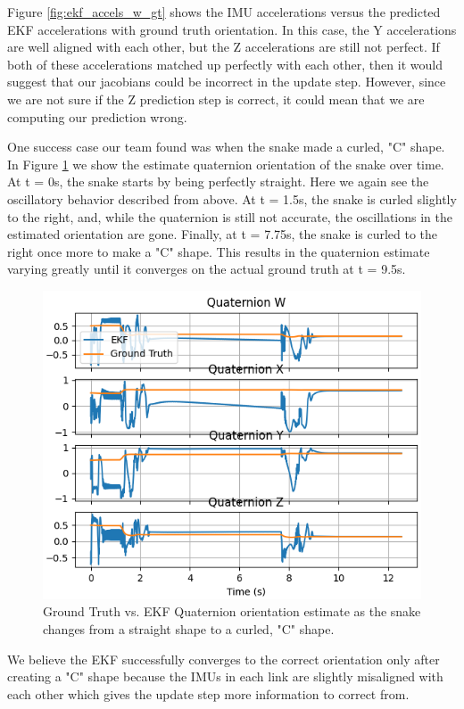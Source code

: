 \documentclass[letterpaper, 10 pt, conference]{ieeeconf}  %
\begin{document}
Figure \ref{fig:ekf_accels_w_gt} shows the IMU accelerations versus the predicted EKF accelerations with ground truth orientation. In this case, the Y accelerations are well aligned with each other, but the Z accelerations are still not perfect. If both of these accelerations matched up perfectly with each other, then it would suggest that our jacobians could be incorrect in the update step. However, since we are not sure if the Z prediction step is correct, it could mean that we are computing our prediction wrong. 

One success case our team found was when the snake made a curled, "C" shape. In Figure \ref{fig:ekf_success} we show the estimate quaternion orientation of the snake over time. At t = 0s, the snake starts by being perfectly straight. Here we again see the oscillatory behavior described from above. At t = 1.5s, the snake is curled slightly to the right, and, while the quaternion is still not accurate, the oscillations in the estimated orientation are gone. Finally, at t = 7.75s, the snake is curled to the right once more to make a "C" shape. This results in the quaternion estimate varying greatly until it converges on the actual ground truth at t = 9.5s.
\begin{figure}[H]
    \centering
    \includegraphics[width = 0.75\linewidth]{quaternion_success_case.png}
    \caption{Ground Truth vs. EKF Quaternion orientation estimate as the snake changes from a straight shape to a curled, "C" shape. }
    \label{fig:ekf_success}
\end{figure}
We believe the EKF successfully converges to the correct orientation only after creating a "C" shape because the IMUs in each link are slightly misaligned with each other which gives the update step more information to correct from.
\end{document}
